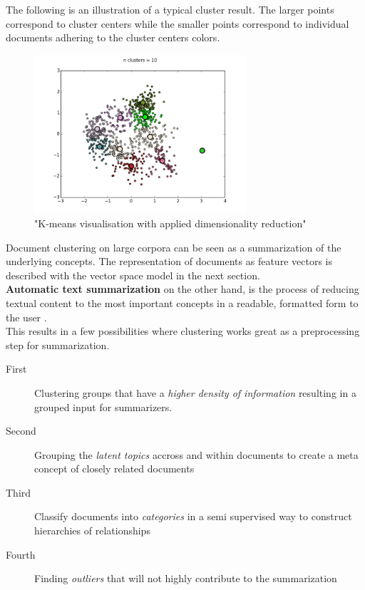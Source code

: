   The following is an illustration of a typical cluster result. The larger points correspond to cluster centers while the smaller points correspond to individual documents adhering to the cluster centers colors. 

  \begin{figure}[h!]
    \centering
      \includegraphics[width=0.7\textwidth]{clustering_intro.png}
      \caption{"K-means visualisation with applied dimensionality reduction"}
      \label{clustering_intro}
  \end{figure}

  Document clustering on large corpora can be seen as a summarization of the underlying concepts. The representation of documents as feature vectors is described with the vector space model in the next section.\\
  \textbf{Automatic text summarization} on the other hand, is the process of reducing textual content to the most important concepts in a readable, formatted form to the user \cite{SumEvaluation2001}.\\
  This results in a few possibilities where clustering works great as a preprocessing step for summarization.
  
  \begin{description}
    \item[First] Clustering groups that have a \emph{higher density of information} resulting in a grouped input for summarizers.
    \item[Second] Grouping the \emph{latent topics} accross and within documents to create a meta concept of closely related documents
    \item[Third] Classify documents into \emph{categories} in a semi supervised way to construct hierarchies of relationships
    \item[Fourth] Finding \emph{outliers} that will not highly contribute to the summarization
  \end{description}

